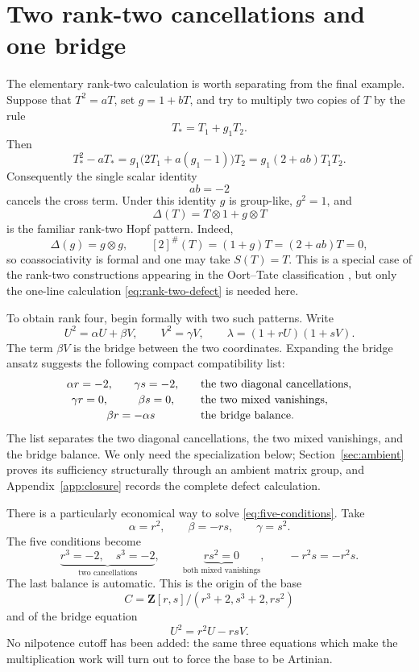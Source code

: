 \documentclass[11pt]{amsart}
\theoremstyle{definition}
\theoremstyle{remark}
\newcommand{\Z}{\mathbf Z}
\newcommand{\ot}{\otimes}
\begin{document}
\section{Two rank-two cancellations and one bridge}

The elementary rank-two calculation is worth separating from the final
example.  Suppose that \(T^2=aT\), set \(g=1+bT\), and try to multiply two
copies of \(T\) by the rule
\[
 T_*=T_1+g_1T_2.
\]
Then
\begin{equation}\label{eq:rank-two-defect}
 T_*^2-aT_*
 =g_1\bigl(2T_1+a(g_1-1)\bigr)T_2
 =g_1(2+ab)T_1T_2.
\end{equation}
Consequently the single scalar identity
\begin{equation}\label{eq:rank-two-cancellation}
 ab=-2
\end{equation}
cancels the cross term.  Under this identity \(g\) is group-like,
\(g^2=1\), and
\[
 \Delta(T)=T\ot1+g\ot T
\]
is the familiar rank-two Hopf pattern.  Indeed,
\[
 \Delta(g)=g\ot g,
 \qquad
 [2]^\#(T)=(1+g)T=(2+ab)T=0,
\]
so coassociativity is formal and one may take \(S(T)=T\).  This is a
special case of the rank-two constructions appearing in the Oort--Tate
classification
\cite{OortTate}, but only the one-line calculation
\eqref{eq:rank-two-defect} is needed here.

To obtain rank four, begin formally with two such patterns.  Write
\[
 U^2=\alpha U+\beta V,
 \qquad
 V^2=\gamma V,
 \qquad
 \lambda=(1+rU)(1+sV).
\]
The term \(\beta V\) is the bridge between the two coordinates.  Expanding
the bridge ansatz suggests the following compact compatibility list:
\begin{equation}\label{eq:five-conditions}
\begin{array}{c@{\qquad}c@{\qquad}l}
 \alpha r=-2,&\gamma s=-2,
   &\text{the two diagonal cancellations},\\[2pt]
 \gamma r=0,&\beta s=0,
   &\text{the two mixed vanishings},\\[2pt]
 \multicolumn{2}{c}{\beta r=-\alpha s}
   &\text{the bridge balance}.
\end{array}
\end{equation}
The list separates the two diagonal cancellations, the two mixed
vanishings, and the bridge balance.  We only need the specialization below;
Section~\ref{sec:ambient} proves its sufficiency structurally through an
ambient matrix group, and Appendix~\ref{app:closure} records the complete
defect calculation.

There is a particularly economical way to solve
\eqref{eq:five-conditions}.  Take
\begin{equation}\label{eq:coefficient-specialization}
 \alpha=r^2,
 \qquad
 \beta=-rs,
 \qquad
 \gamma=s^2.
\end{equation}
The five conditions become
\[
 \underbrace{r^3=-2,\quad s^3=-2}_{\text{two cancellations}},
 \qquad
 \underbrace{rs^2=0}_{\text{both mixed vanishings}},
 \qquad
 -r^2s=-r^2s.
\]
The last balance is automatic.  This is the origin of the base
\[
 C=\Z[r,s]/(r^3+2,s^3+2,rs^2)
\]
and of the bridge equation
\[
 U^2=r^2U-rsV.
\]
No nilpotence cutoff has been added: the same three equations which make
the multiplication work will turn out to force the base to be Artinian.
\end{document}
